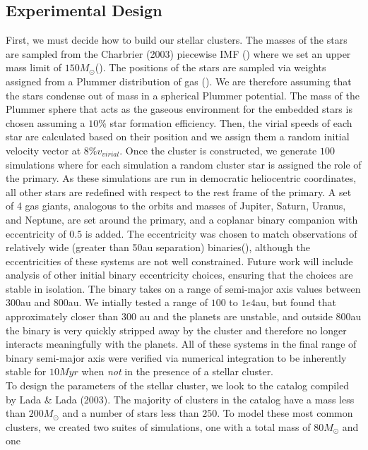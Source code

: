 \documentclass{aastex631}
\begin{document}
\subsection{Experimental Design}
First, we must decide how to build our stellar clusters. The masses of the stars are sampled from the Charbrier (2003) piecewise IMF (\cite{cha03}) where we set
an upper mass limit of $150 M_{\odot}$(\cite{wei04}).
The positions of the stars are sampled via weights assigned from a Plummer distribution of gas (\cite{plu11}). We are therefore assuming that the stars
condense out of mass in a spherical Plummer potential. The mass of the Plummer sphere that acts as the gaseous environment for the
embedded stars is chosen assuming a $10\%$ star formation efficiency. Then, the virial speeds of each star are calculated based on their position
and we assign them a random initial velocity vector at $8\% v_{virial}$\cite{lev10}. Once the cluster is constructed, we generate $100$ simulations
where for each simulation a random cluster star is assigned the role of the primary. As these simulations are run in democratic heliocentric
coordinates, all other stars are redefined with respect to the rest frame of the primary. A set of 4 gas giants, analogous to the orbits and 
masses of Jupiter, Saturn, Uranus, and Neptune, are set around the primary, and a coplanar binary companion with eccentricity of 
$0.5$ is added. The eccentricity was chosen to match observations of relatively wide (greater
than 50au separation) binaries(\cite{tok16}), although the eccentricities of these systems are not well constrained. Future work will include
analysis of other initial binary eccentricity choices, ensuring that the choices are stable in isolation.
The binary takes on a range of semi-major axis values between $300$au and $800$au. We intially tested
a range of $100$ to $1e4$au, but found that approximately closer than $300$ au and the planets are unstable, and outside $800$au 
the binary is very quickly stripped away by the cluster and therefore no longer interacts meaningfully with the planets. 
 All of these systems in the final range of binary semi-major axis were verified via numerical integration to be inherently stable for $10 Myr$ when \textit{not} 
 in the presence of a stellar cluster. \\
\indent To design the parameters of the stellar cluster, we look to the catalog compiled by Lada \& Lada (2003)\cite{lad03}. The majority of clusters in the catalog have a mass less than
$200M_{\odot}$ and a number of stars less than $250$. To model these most common clusters, we created two suites of simulations, one with a total mass of $80M_{\odot}$ and one
\end{document}
